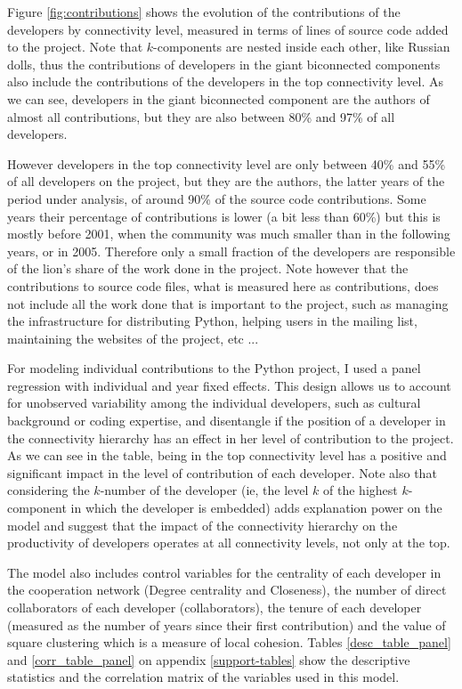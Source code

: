 Figure \ref{fig:contributions} shows the evolution of the contributions of the developers by connectivity level, measured in terms of lines of source code added to the project. Note that $k$-components are nested inside each other, like Russian dolls, thus the contributions of developers in the giant biconnected components also include the contributions of the developers in the top connectivity level. As we can see, developers in the giant biconnected component are the authors of almost all contributions, but they are also between 80\% and 97\% of all developers.

However developers in the top connectivity level are only between 40\% and 55\% of all developers on the project, but they are the authors, the latter years of the period under analysis, of around 90\% of the source code contributions. Some years their percentage of contributions is lower (a bit less than 60\%) but this is mostly before 2001, when the community was much smaller than in the following years, or in 2005. Therefore only a small fraction of the developers are responsible of the lion's share of the work done in the project. Note however that the contributions to source code files, what is measured here as contributions, does not include all the work done that is important to the project, such as managing the infrastructure for distributing Python, helping users in the mailing list, maintaining the websites of the project, etc ... 

For modeling individual contributions to the Python project, I used a panel regression with individual and year fixed effects. This design allows us to account for unobserved variability among the individual developers, such as cultural background or coding expertise, and disentangle if the position of a developer in the connectivity hierarchy has an effect in her level of contribution to the project. As we can see in the table, being in the top connectivity level has a positive and significant impact in the level of contribution of each developer. Note also that considering the $k$-number of the developer (ie, the level $k$ of the highest $k$-component in which the developer is embedded) adds explanation power on the model and suggest that the impact of the connectivity hierarchy on the productivity of developers operates at all connectivity levels, not only at the top.

The model also includes control variables for the centrality of each developer in the cooperation network (Degree centrality and Closeness), the number of direct collaborators of each developer (collaborators), the tenure of each developer (measured as the number of years since their first contribution) and the value of square clustering which is a measure of local cohesion. Tables \ref{desc_table_panel} and \ref{corr_table_panel} on appendix \ref{support-tables} show the descriptive statistics and the correlation matrix of the variables used in this model.

